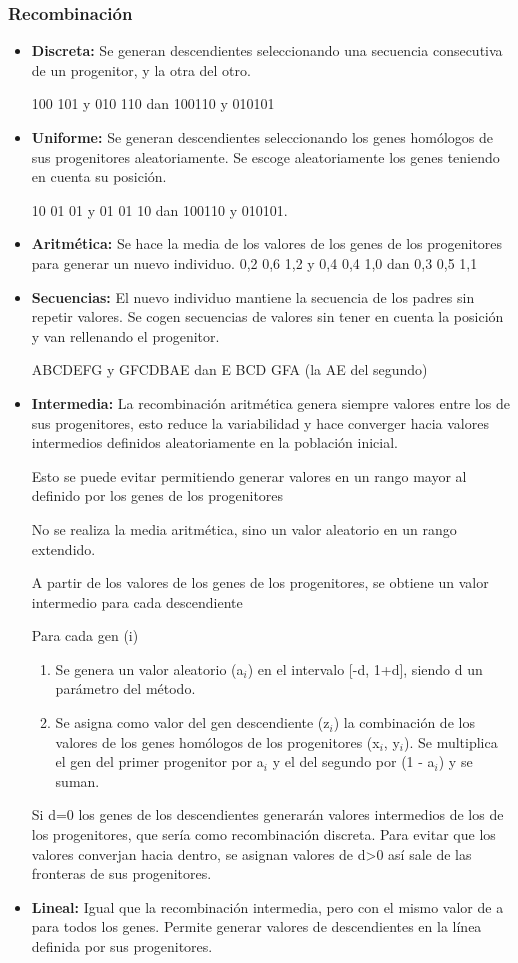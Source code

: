 \documentclass[12pt, twoside, openright]{report} %
\begin{document}
\subsubsection{Recombinación}
\begin{itemize}
	\item \textbf{Discreta:} Se generan descendientes seleccionando una secuencia consecutiva de un progenitor, y la otra del otro.

	      100 101 y 010 110 dan 100110 y 010101
	\item \textbf{Uniforme:} Se generan descendientes seleccionando los genes homólogos de sus progenitores aleatoriamente. Se escoge aleatoriamente los genes teniendo en cuenta su posición.

	      10 01 01 y 01 01 10 dan 100110 y 010101.
	\item \textbf{Aritmética:} Se hace la media de los valores de los genes de los progenitores para generar un nuevo individuo.
	      0,2 0,6 1,2 y 0,4 0,4 1,0 dan 0,3 0,5 1,1
	\item \textbf{Secuencias:} El nuevo individuo mantiene la secuencia de los padres sin repetir valores. Se cogen secuencias de valores sin tener en cuenta la posición y van rellenando el progenitor.

	      ABCDEFG y GFCDBAE dan E BCD GFA (la AE del segundo)
	\item \textbf{Intermedia:} La recombinación aritmética genera siempre valores entre los de sus progenitores, esto reduce la variabilidad y hace converger hacia valores intermedios definidos aleatoriamente en la población inicial.

	      Esto se puede evitar permitiendo generar valores en un rango mayor al definido por los genes de los progenitores

	      No se realiza la media aritmética, sino un valor aleatorio en un rango extendido.

	      A partir de los valores de los genes de los progenitores, se obtiene un valor intermedio para cada descendiente

	      Para cada gen (i)
	      \begin{enumerate}
		      \item Se genera un valor aleatorio (a$_i$) en el intervalo [-d, 1+d], siendo d un parámetro del método.
		      \item Se asigna como valor del gen descendiente (z$_i$) la combinación de los valores de los genes homólogos de los progenitores (x$_i$, y$_i$). Se multiplica el gen del primer progenitor por a$_i$ y el del segundo por (1 - a$_i$) y se suman.
	      \end{enumerate}

	      Si d=0 los genes de los descendientes generarán valores intermedios de los de los progenitores, que sería como recombinación discreta. Para evitar que los valores converjan hacia dentro, se asignan valores de d>0 así sale de las fronteras de sus progenitores.
	\item \textbf{Lineal:} Igual que la recombinación intermedia, pero con el mismo valor de a para todos los genes. Permite generar valores de descendientes en la línea definida por sus progenitores.
\end{itemize}
\end{document}
